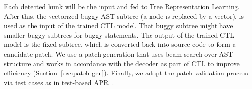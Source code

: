 Each detected hunk will be the input and fed to Tree
Representation Learning.
%
After this, the vectorized buggy AST subtree (a node is replaced by a
vector), is used as the input of the trained CTL model. That buggy
subtree might have smaller buggy subtrees for buggy statements.  The
output of the trained CTL model is the fixed subtree, which is
converted back into source code to form a candidate patch. We use a
patch generation that uses beam search over AST structure and
works in accordance with the decoder as part of CTL to improve
efficiency (Section~\ref{sec:patch-gen}). Finally, we adopt the patch
validation process via test cases as in test-based APR~\cite{icse20}.




